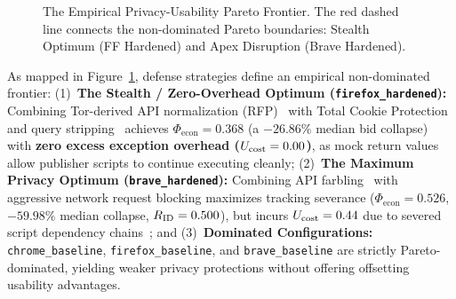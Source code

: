 \begin{figure}[t]
\centering
{}
\caption{The Empirical Privacy-Usability Pareto Frontier. The red dashed line connects the non-dominated Pareto boundaries: Stealth Optimum (FF Hardened) and Apex Disruption (Brave Hardened).}
\label{fig:pareto}
\end{figure}

As mapped in Figure~\ref{fig:pareto}, defense strategies define an empirical non-dominated frontier:
(1)~\textbf{The Stealth / Zero-Overhead Optimum (\texttt{firefox\_hardened}):} Combining Tor-derived API normalization (RFP)~\cite{tor_design, mozilla_rfp_docs} with Total Cookie Protection and query stripping~\cite{randall2022measuring} achieves $\Phi_{\text{econ}} = 0.368$ (a $-26.86\%$ median bid collapse) with \textbf{zero excess exception overhead ($U_{\text{cost}} = 0.00$)}, as mock return values allow publisher scripts to continue executing cleanly;
(2)~\textbf{The Maximum Privacy Optimum (\texttt{brave\_hardened}):} Combining API farbling~\cite{brave_fingerprinting_protections_2025} with aggressive network request blocking maximizes tracking severance ($\Phi_{\text{econ}} = 0.526$, $-59.98\%$ median collapse, $R_{\text{ID}} = 0.500$), but incurs $U_{\text{cost}} = 0.44$ due to severed script dependency chains~\cite{iqbal2020adgraph}; and
(3)~\textbf{Dominated Configurations:} \nolinkurl{chrome_baseline}, \nolinkurl{firefox_baseline}, and \nolinkurl{brave_baseline} are strictly Pareto-dominated, yielding weaker privacy protections without offering offsetting usability advantages.

